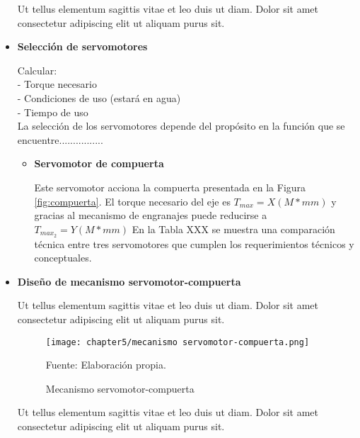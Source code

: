 \begin{itemize}
	Ut tellus elementum sagittis vitae et leo duis ut diam. Dolor sit amet consectetur adipiscing elit ut aliquam purus sit. 

	
	\item \textbf{Selección de servomotores}
		
	Calcular: \\
	- Torque necesario \\
	- Condiciones de uso (estará en agua) \\
	- Tiempo de uso \\
	
	La selección de los servomotores depende del propósito en la función que se encuentre................
	
	\begin{itemize}
		
		
		\item \textbf{Servomotor de compuerta}
		
		Este servomotor acciona la compuerta presentada en la Figura \ref{fig:compuerta}. El torque necesario del eje es $T_{max}=X (M*mm)$  y gracias al mecanismo de engranajes puede reducirse a $T_{max_2}=Y (M*mm)$ En la Tabla XXX se muestra una comparación técnica entre tres servomotores que cumplen los requerimientos técnicos y conceptuales.
		
	\end{itemize}


	\item \textbf{Diseño de mecanismo servomotor-compuerta} 
	
	Ut tellus elementum sagittis vitae et leo duis ut diam. Dolor sit amet consectetur adipiscing elit ut aliquam purus sit. 
	
	\begin{figure}[H]
		\centering
		\texttt{[image: chapter5/mecanismo servomotor-compuerta.png]}
		\caption{Mecanismo servomotor-compuerta}
		\begin{myflushleftportland}
			Fuente: Elaboración propia.
		\end{myflushleftportland}
		\label{fig:mecanismo servomotor-compuerta}
	\end{figure}
	
	Ut tellus elementum sagittis vitae et leo duis ut diam. Dolor sit amet consectetur adipiscing elit ut aliquam purus sit. 
	

\end{itemize}
